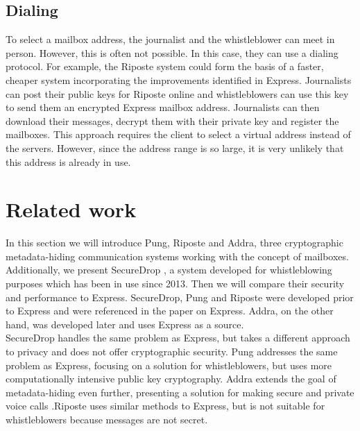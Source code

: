 \documentclass[a4paper]{article}
\begin{document}
\subsection{Dialing}
To select a mailbox address, the journalist and the whistleblower can meet in person. However, this is often not possible. In this case, they can use a dialing protocol. For example, the Riposte system could form the basis of a faster, cheaper system incorporating the improvements identified in Express.  Journalists can post their public keys for Riposte online and whistleblowers can use this key to send them an encrypted Express mailbox address. Journalists can then download their messages, decrypt them with their private key and register the mailboxes. This approach requires the client to select a virtual address instead of the servers. However, since the address range is so large, it is very unlikely that this address is already in use. 

\section{Related work} %


\label{sec:relwork}
In this section we will introduce Pung, Riposte and Addra, three cryptographic metadata-hiding communication systems working with the concept of mailboxes. Additionally, we present SecureDrop \citep{securedrop}, a system developed for whistleblowing purposes which has been in use since 2013. Then we will compare their security and performance to Express. SecureDrop, Pung and Riposte were developed prior to Express and were referenced in the paper on Express. Addra, on the other hand, was developed later and uses Express as a source.\\ 
SecureDrop handles the same problem as Express, but takes a different approach to privacy and does not offer cryptographic security. Pung addresses the same problem as Express, focusing on a solution for whistleblowers, but uses more computationally intensive public key cryptography. Addra extends the goal of metadata-hiding even further, presenting a solution for making secure and private voice calls \citep{Ahmad2021}.Riposte uses similar methods to Express, but is not suitable for whistleblowers because messages are not secret.
\end{document}
